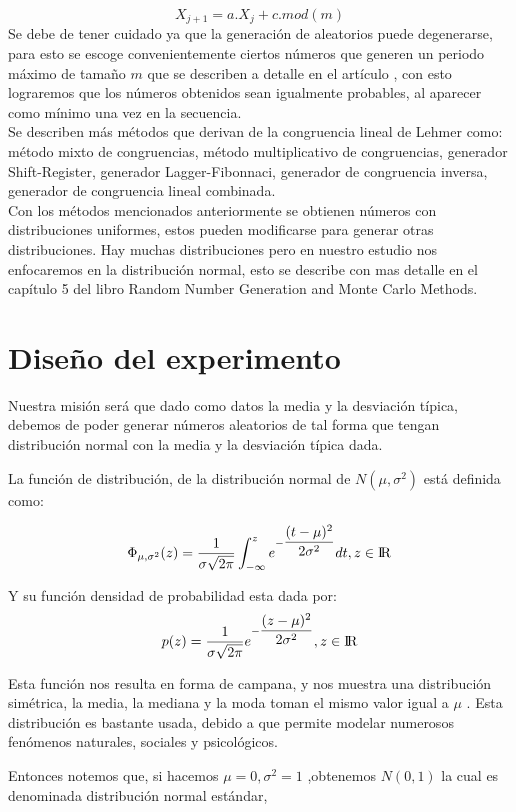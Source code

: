 \documentclass[conference,a4paper]{IEEEtran}
\begin{document}
\begin{equation}
X_{j+1} = a.X_{j}+c.mod(m)
\end{equation}
Se debe de tener cuidado ya que la generaci\'on de aleatorios puede degenerarse, para esto se escoge convenientemente ciertos n\'umeros que generen un periodo m\'aximo de tama\~no $m$ que se describen a detalle en el art\'iculo \cite{b2}, con esto lograremos que los n\'umeros obtenidos sean igualmente probables, al aparecer como m\'inimo una vez en la secuencia.\\
Se describen m\'as m\'etodos que derivan de la congruencia lineal de Lehmer como: m\'etodo mixto de congruencias, m\'etodo multiplicativo de congruencias, generador Shift-Register, generador Lagger-Fibonnaci, generador de congruencia inversa, generador de congruencia lineal combinada.\\
Con los m\'etodos mencionados anteriormente se obtienen n\'umeros con distribuciones uniformes, estos pueden modificarse para generar otras distribuciones. Hay muchas distribuciones pero en nuestro estudio nos enfocaremos en la distribuci\'on normal, esto se describe con mas detalle en el cap\'itulo 5 del libro Random Number Generation and Monte Carlo Methods\cite{b3}. 
  
\section{\textbf{Dise\~no del experimento}}
Nuestra misi\'on ser\'a que dado como datos la media y la desviaci\'on t\'ipica, debemos de poder generar n\'umeros aleatorios de tal forma que tengan distribuci\'on normal con la media y la desviaci\'on t\'ipica dada.

La funci\'on de distribuci\'on, de la distribuci\'on normal de $N(\mu,\sigma^2)$ est\'a definida como:

$$\Phi_{\mu,\sigma^2}(z) = \dfrac {1}{\sigma\sqrt{2\pi}}
\int_{-\infty}^{z} e^{-\dfrac{(t-\mu)^2}{2\sigma^2}} dt, z \in {\rm I\!R} $$

Y su funci\'on densidad de probabilidad esta dada por:
$$p(z) = \dfrac {1}{\sigma\sqrt{2\pi}}
e^{-\dfrac{(z-\mu)^2}{2\sigma^2}} , z \in {\rm I\!R} $$

Esta funci\'on nos resulta en forma de campana, y nos muestra una distribuci\'on sim\'etrica, la media, la mediana y la moda toman el mismo valor igual a $\mu$ . Esta distribuci\'on es bastante usada, debido a que permite modelar numerosos fen\'omenos naturales, sociales y psicol\'ogicos.

Entonces notemos que, si hacemos $\mu=0,\sigma^2=1$ ,obtenemos $N(0,1)$
la cual es denominada distribuci\'on normal est\'andar, 
\end{document}
